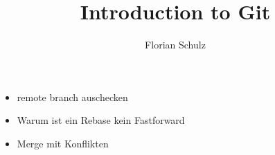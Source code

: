 \documentclass{beamer}
\title[Git]{Introduction to Git}
\author{Florian Schulz}
\begin{document}
\begin{frame}
\titlepage
\end{frame}

\begin{frame}
\begin{itemize}
  \item remote branch auschecken
  \item Warum ist ein Rebase kein Fastforward
  \item Merge mit Konflikten
\end{itemize}
\end{frame}



\end{document}

